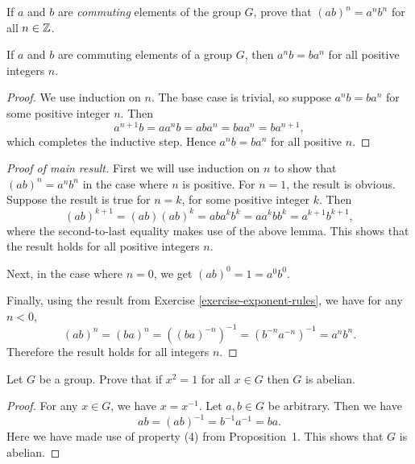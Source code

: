 If $a$ and $b$ are {\em commuting} elements of the group
$G$, prove that $(ab)^n = a^nb^n$ for all $n\in\mathbb{Z}$.
\begin{lem}
  If $a$ and $b$ are commuting elements of a group $G$, then
  $a^nb = ba^n$ for all positive integers $n$.
\end{lem}
\begin{proof}
  We use induction on $n$. The base case is trivial, so suppose
  $a^nb = ba^n$ for some positive integer $n$. Then
  \begin{equation*}
    a^{n+1}b = aa^nb = aba^n = baa^n = ba^{n+1},
  \end{equation*}
  which completes the inductive step. Hence $a^nb = ba^n$ for all
  positive $n$.
\end{proof}
\begin{proof}[Proof of main result]
  First we will use induction on $n$ to show that $(ab)^n = a^nb^n$ in
  the case where $n$ is positive. For $n = 1$, the result is
  obvious. Suppose the result is true for $n = k$, for some positive
  integer $k$. Then
  \begin{equation*}
    (ab)^{k+1} = (ab)(ab)^k = aba^kb^k
    = aa^kbb^k = a^{k+1}b^{k+1},
  \end{equation*}
  where the second-to-last equality makes use of the above lemma. This
  shows that the result holds for all positive integers $n$.

  Next, in the case where $n = 0$, we get $(ab)^0 = 1 = a^0b^0$.

  Finally, using the result from Exercise
  \ref{exercise-exponent-rules}, we have for any $n<0$,
  \begin{equation*}
    (ab)^n = (ba)^n = \left((ba)^{-n}\right)^{-1}
    = \left(b^{-n}a^{-n}\right)^{-1}
    = a^nb^n.
  \end{equation*}
  Therefore the result holds for all integers $n$.
\end{proof}

 Let $G$ be a group. Prove that if $x^2 = 1$ for all
$x\in G$ then $G$ is abelian.
\begin{proof}
  For any $x\in G$, we have $x = x^{-1}$. Let $a,b\in G$ be
  arbitrary. Then we have
  \begin{equation*}
    ab = (ab)^{-1} = b^{-1}a^{-1} = ba.
  \end{equation*}
  Here we have made use of property (4) from Proposition~1. This shows
  that $G$ is abelian.
\end{proof}
